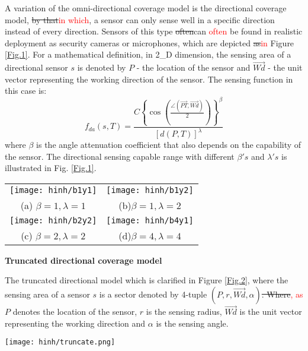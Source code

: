 \documentclass[final]{elsarticle}
\begin{document}
A variation of the omni-directional coverage model is the directional coverage model, \sout{by that}\textcolor{red}{in which}, a sensor can only sense well in a specific direction instead of every direction. Sensors of this type \sout{often}can \textcolor{red}{often} be found in realistic deployment as security cameras or microphones, which are depicted \sout{as}\textcolor{red}{in} Figure \ref{Fig.1}. For a mathematical definition, in 2\_D dimension, the sensing area of a directional sensor $ s $ is denoted by $ P $ - the location of the sensor and $ \overrightarrow{Wd}$ - the unit vector representing the working direction of the sensor. The sensing function in this case is:
\begin{equation}
\label{eq2}
f_{da}({s},T) = \frac{{C{{\left\{ {\cos \left( {\frac{{\angle (\overrightarrow {PT} ,\overrightarrow {Wd}) }}{2}} \right)} \right\}}^\beta }}}{{{{\left[ {d(P,T)} \right]}^\lambda }}}
\end{equation}
where $\beta$ is the angle attenuation coefficient that also depends on the capability of the sensor. The directional sensing capable range with different $ \beta's $ and $ \lambda's $ is illustrated in Fig. \ref{Fig.1}. \\
\begin{figure*}[h]
	\begin{tabular}{cc}
		\texttt{[image: hinh/b1y1]}&\texttt{[image: hinh/b1y2]}\\
		(a) $\beta =1, \lambda=1 $ &(b)$ \beta=1, \lambda=2 $\\
		\texttt{[image: hinh/b2y2]}&\texttt{[image: hinh/b4y1]}\\
		(c) $ \beta=2, \lambda=2 $& (d)$ \beta=4, \lambda=4 $\\
	\end{tabular}
	\centering
	\caption{Illustration attenuated directional sensing model with different $ \beta's $ and $ \lambda's $
	}
	\label{Fig.1}       %
\end{figure*}

\noindent\textbf{Truncated directional coverage model} 

The truncated directional model which is clarified in Figure \ref{Fig.2}, where the sensing area of a sensor $ s $ is a sector denoted by 4-tuple $( P, r, \overrightarrow{Wd}, \alpha )$\sout{. Where}\textcolor{red}{, as} $ P $ denotes the location of the sensor, $ r $ is the sensing radius, $ \overrightarrow{Wd}$ is the unit vector representing the working direction and $ \alpha $ is the sensing angle. 
\begin{figure*}[h]
	\centering
	\texttt{[image: hinh/truncate.png]}
	\caption{Sensing capability of truncated directional sensor}
	\label{Fig.2}       %
\end{figure*}
\end{document}
